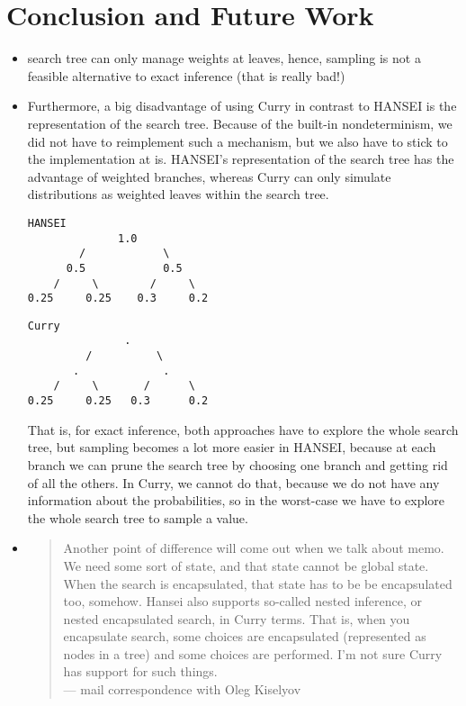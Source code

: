 \documentclass[
12pt, %
a4paper, %
oneside, %
]{llncs}
\begin{document}
\section{Conclusion and Future Work}
\begin{itemize}
\item search tree can only manage weights at leaves, hence, sampling
  is not a feasible alternative to exact inference (that is really
  bad!)
\item Furthermore, a big disadvantage of using Curry in contrast to
  HANSEI is the representation of the search tree. %
  Because of the built-in nondeterminism, we did not have to
  reimplement such a mechanism, but we also have to stick to the
  implementation at is. %
  HANSEI's representation of the search tree has the advantage of
  weighted branches, whereas Curry can only simulate distributions as
  weighted leaves within the search tree. %

\begin{verbatim}
HANSEI
              1.0
        /            \
      0.5            0.5
    /     \        /     \
0.25     0.25    0.3     0.2
\end{verbatim}

\begin{verbatim}
Curry
               .
         /          \
       .             .
    /     \       /      \
0.25     0.25   0.3      0.2
\end{verbatim}

  That is, for exact inference, both approaches have to explore the
  whole search tree, but sampling becomes a lot more easier in HANSEI,
  because at each branch we can prune the search tree by choosing one
  branch and getting rid of all the others. %
  In Curry, we cannot do that, because we do not have any information
  about the probabilities, so in the worst-case we have to explore the
  whole search tree to sample a value. %

\item 
\begin{quote}
  Another point of difference will come out when we talk about memo. %
  We need some sort of state, and that state cannot be global state. %
  When the search is encapsulated, that state has to be be
  encapsulated too, somehow. %
  Hansei also supports so-called nested inference, or nested
  encapsulated search, in Curry terms. %
  That is, when you encapsulate search, some choices are encapsulated
  (represented as nodes in a tree) and some choices are performed. %
  I'm not sure Curry has support for such things. \\%

--- mail correspondence with Oleg Kiselyov
\end{quote}
\end{itemize}
\end{document}

